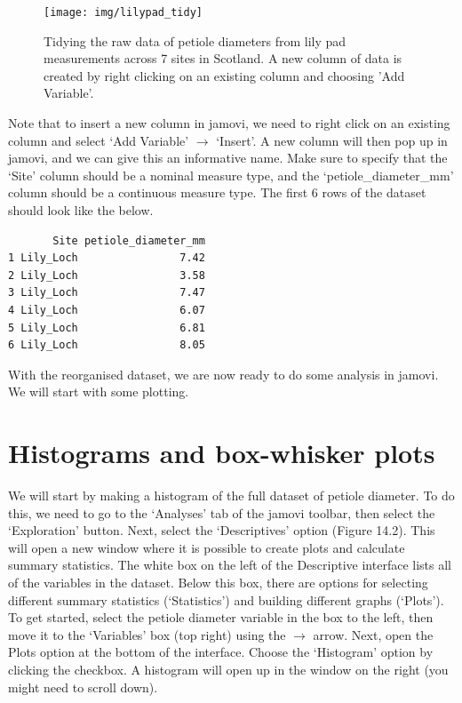 \documentclass[
  openany]{scrbook}
\begin{document}
\begin{figure}
\texttt{[image: img/lilypad\_tidy]} \caption{Tidying the raw data of petiole diameters from lily pad measurements across 7 sites in Scotland. A new column of data is created by right clicking on an existing column and choosing 'Add Variable'.}\label{fig:unnamed-chunk-45}
\end{figure}

Note that to insert a new column in jamovi, we need to right click on an existing column and select `Add Variable' \(\to\) `Insert'.
A new column will then pop up in jamovi, and we can give this an informative name.
Make sure to specify that the `Site' column should be a nominal measure type, and the `petiole\_diameter\_mm' column should be a continuous measure type.
The first 6 rows of the dataset should look like the below.

\begin{verbatim}
       Site petiole_diameter_mm
1 Lily_Loch                7.42
2 Lily_Loch                3.58
3 Lily_Loch                7.47
4 Lily_Loch                6.07
5 Lily_Loch                6.81
6 Lily_Loch                8.05
\end{verbatim}

With the reorganised dataset, we are now ready to do some analysis in jamovi.
We will start with some plotting.

\hypertarget{histograms-and-box-whisker-plots}{%
\section{Histograms and box-whisker plots}\label{histograms-and-box-whisker-plots}}

We will start by making a histogram of the full dataset of petiole diameter.
To do this, we need to go to the `Analyses' tab of the jamovi toolbar, then select the `Exploration' button.
Next, select the `Descriptives' option (Figure 14.2).
This will open a new window where it is possible to create plots and calculate summary statistics.
The white box on the left of the Descriptive interface lists all of the variables in the dataset.
Below this box, there are options for selecting different summary statistics (`Statistics') and building different graphs (`Plots').
To get started, select the petiole diameter variable in the box to the left, then move it to the `Variables' box (top right) using the \(\to\) arrow.
Next, open the Plots option at the bottom of the interface.
Choose the `Histogram' option by clicking the checkbox.
A histogram will open up in the window on the right (you might need to scroll down).
\end{document}
